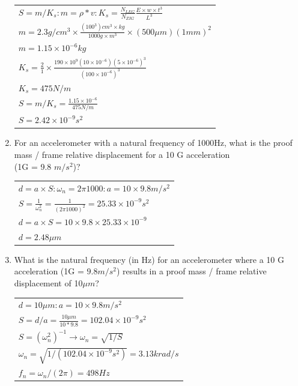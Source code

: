 \documentclass{article}
\begin{document}
\begin{multicols}{2}
\begin{enumerate}
		\begin{tabular}{ l }
			$S = m/K_s \colon m = \rho * v \colon K_s = \frac{N_{LEG}}{N_{ZIG}}\frac{E\times w \times t^3}{L^3}$\\
			$m = 2.3 g/cm^3 \times \frac{(100^3)cm^3 \times kg}{1000g\times m^3} \times (500\mu m)(1mm)^2$\\
			$m = 1.15 \times 10^{-6} kg$\\
			$K_s = \frac{2}{1} \times \frac{190 \times 10^9 (10\times10^{-6})(5\times10^{-6})^3}{(100\times10^{-6})^3}$\\
			$K_s = 475N/m$\\
			$S = m/K_s = \frac{1.15\times10^{-6}}{475N/m}$\\
			$S = 2.42 \times 10^{-9} s^2$
		\end{tabular}
\item\label{p4}
For an accelerometer with a natural frequency of 1000Hz, what is the proof mass /
     frame relative displacement for a 10 G acceleration \\(1G = 9.8 $m/s^2$)?
	
		\begin{tabular}{ l }
			$d = a \times S \colon \omega_n = 2 \pi 1000 \colon a = 10 \times 9.8 m/s^2$\\

			$S = \frac{1}{\omega_n^2} = \frac{1}{(2 \pi 1000)^2} = 25.33\times 10^{-9} s^2$\\
			$d = a\times S = 10 \times 9.8 \times 25.33 \times 10^{-9}$\\
			$d = 2.48 \mu m$
		\end{tabular}
  
\item\label{p5}
What is the natural frequency (in Hz) for an accelerometer where a 10 G
     acceleration (1G = $9.8 m/s^2$) results in a proof mass / frame relative displacement
     of 10$\mu m$?

		\begin{tabular}{ l }
			$d = 10\mu m \colon a = 10\times 9.8 m/s^2$\\
			$S = d/a = \frac{10\mu m}{10*9.8} =  102.04 \times 10^{-9} s^2$\\
			$S = (\omega_n^2)^{-1} \rightarrow \omega_n = \sqrt{1/S}$\\
			$\omega_n = \sqrt{1/(102.04 \times 10^{-9} s^2)} = 3.13 k rad/s$\\
			$f_n = \omega_n /(2\pi) = 498 Hz$
		\end{tabular}


\end{enumerate}
\end{multicols}
\end{document}
